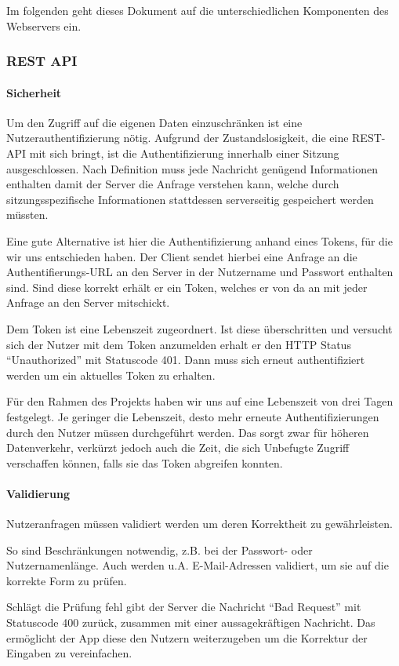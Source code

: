 Im folgenden geht dieses Dokument auf die unterschiedlichen Komponenten des Webservers ein.
\subsubsection{REST API}
\paragraph{Sicherheit}
Um den Zugriff auf die eigenen Daten einzuschränken ist eine Nutzerauthentifizierung nötig. Aufgrund der Zustandslosigkeit, die eine REST-API mit sich bringt, ist die Authentifizierung innerhalb einer Sitzung ausgeschlossen. Nach Definition muss jede Nachricht genügend Informationen enthalten damit der Server die Anfrage verstehen kann, welche durch sitzungsspezifische Informationen stattdessen serverseitig gespeichert werden müssten.

Eine gute Alternative ist hier die Authentifizierung anhand eines Tokens, für die wir uns entschieden haben. Der Client sendet hierbei eine Anfrage an die Authentifierungs-URL an den Server in der Nutzername und Passwort enthalten sind. Sind diese korrekt erhält er ein Token, welches er von da an mit jeder Anfrage an den Server mitschickt.

Dem Token ist eine Lebenszeit zugeordnert. Ist diese überschritten und versucht sich der Nutzer mit dem Token anzumelden erhalt er den HTTP Status ``Unauthorized'' mit Statuscode 401. Dann muss sich erneut authentifiziert werden um ein aktuelles Token zu erhalten.

Für den Rahmen des Projekts haben wir uns auf eine Lebenszeit von drei Tagen festgelegt. Je geringer die Lebenszeit, desto mehr erneute Authentifizierungen durch den Nutzer müssen durchgeführt werden. Das sorgt zwar für höheren Datenverkehr, verkürzt jedoch auch die Zeit, die sich Unbefugte Zugriff verschaffen können, falls sie das Token abgreifen konnten. 
\paragraph{Validierung}
Nutzeranfragen müssen validiert werden um deren Korrektheit zu gewährleisten.

So sind Beschränkungen notwendig, z.B. bei der Passwort- oder Nutzernamenlänge. Auch werden u.A. E-Mail-Adressen validiert, um sie auf die korrekte Form zu prüfen.

Schlägt die Prüfung fehl gibt der Server die Nachricht ``Bad Request'' mit Statuscode 400 zurück, zusammen mit einer aussagekräftigen Nachricht. Das ermöglicht der App diese den Nutzern weiterzugeben um die Korrektur der Eingaben zu vereinfachen.

